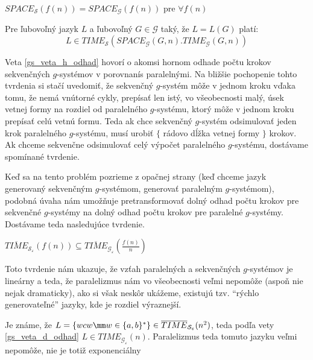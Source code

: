\begin{veta}
$SPACE_{\mathcal{S}}(f(n))=SPACE_{\mathcal{G}}(f(n))$ pre $\forall
f(n)$
\end{veta}

\begin{veta}\label{gs_veta_h_odhad}
Pre ľubovoľný jazyk $L$ a ľubovoľný
$G\in\mathcal{G}$ taký, že $L=L(G)$ platí:
\[
L\in
TIME_{\mathcal{S}}(SPACE_{\mathcal{G}}(G,n).TIME_{\mathcal{G}}(G,n))
\]
\end{veta}

Veta \ref{gs_veta_h_odhad} hovorí o akomsi hornom odhade počtu  krokov
sekvenčných \mbox{$g$-sys}té\-mov v porovnaní\linebreak s
paralelnými. Na bližšie pochopenie tohto tvrdenia si stačí
uvedomiť, že sekvenčný $g$-systém môže v jednom kroku vďaka tomu,
že nemá vnútorné cykly, prepísať len istý, vo všeobecnosti malý,
úsek vetnej formy na rozdiel od paralelného $g$-systému, ktorý
môže v jednom kroku prepísať celú vetnú formu. Teda ak chce
sekvenčný $g$-systém odsimulovať jeden krok paralelného\linebreak
$g$-systému, musí urobiť $\{$ rádovo dĺžka vetnej formy $\}$
krokov. Ak chceme sekvenčne odsimulovať celý výpočet paralelného
$g$-systému, dostávame spomínané tvrdenie.

\smallskip
Keď sa na tento problém pozrieme z opačnej strany (keď chceme
jazyk generovaný sekvenčným $g$-systémom, generovať paralelným
$g$-systémom), podobná úvaha nám umožňuje pretransformovať dolný
odhad počtu krokov pre sekvenčné $g$-systémy na dolný odhad počtu
krokov pre paralelné $g$-systémy. Dostávame teda nasledujúce
tvrdenie.

\begin{veta}
\label{gs_veta_d_odhad}
$\overline{TIME}_{\mathcal{S_{\varepsilon}}}(f(n))\subseteq
\overline{TIME}_{\mathcal{G_{\varepsilon}}}(\frac{f(n)}{n})$
\end{veta}

Toto tvrdenie nám ukazuje, že vzťah paralelných a sekvenčných
$g$-systémov je lineárny a teda, že paralelizmus nám vo
všeobecnosti veľmi nepomôže (aspoň nie nejak dramaticky), ako si
však neskôr ukážeme, existujú tzv. ``rýchlo generovateľné''
jazyky, kde je rozdiel výraznejší.

\begin{priklad}
Je známe, že $L=\{wcw\mm
w\in\{a,b\}^*\}\in\overline{TIME}_{\mathcal{S_{\varepsilon}}}(n^2)$,
teda podľa vety \ref{gs_veta_d_odhad} $L\in
TIME_{\mathcal{G_{\varepsilon}}}(n)$. Paralelizmus teda tomuto
jazyku veľmi nepomôže, nie je totiž exponenciálny
\end{priklad}

